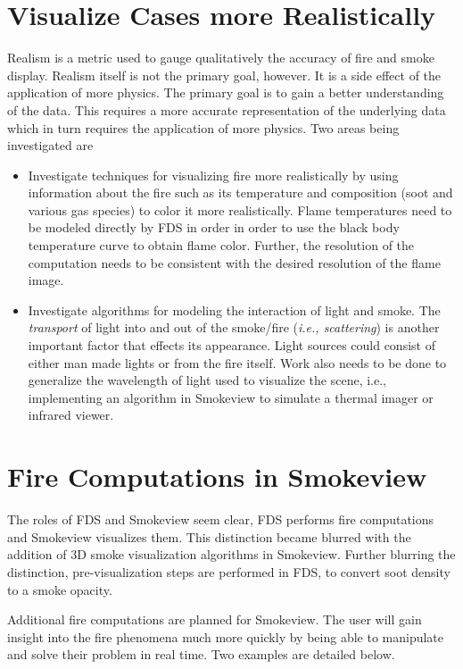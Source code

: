 \documentclass[11pt,twoside]{book}
\begin{document}
\section{Visualize Cases more Realistically}
Realism is a metric used to gauge qualitatively the accuracy of
fire and smoke display. Realism itself is not the primary goal,
however.  It is a side effect of the application of more physics.
The primary goal is to gain a better understanding of the data.
This requires a more accurate representation of the underlying
data which in turn requires the application of more physics.  Two
areas being investigated are
\begin{itemize}
\item Investigate techniques for visualizing fire more
realistically by using information about the fire such as its
temperature and composition (soot and various gas species) to
color it more realistically.  Flame temperatures need to be
modeled directly by FDS in order in order to use the black body
temperature curve to obtain flame color.  Further, the resolution
of the computation needs to be consistent with the desired
resolution of the flame image.

\item Investigate algorithms for modeling the interaction of light
and smoke. The {\em transport} of light into and out of the
smoke/fire ({\em i.e., scattering}) is another important factor
that effects its appearance.  Light sources could consist of
either man made lights or from the fire itself.  Work also needs
to be done to generalize the wavelength of light used to visualize
the scene, i.e., implementing an algorithm in Smokeview to
simulate a thermal imager or infrared viewer.
\end{itemize}

%
%

\section{Fire Computations in Smokeview}
The roles of FDS and Smokeview seem clear, FDS performs fire
computations and Smokeview visualizes them. This distinction
became blurred with the addition of 3D smoke visualization
algorithms in Smokeview. Further blurring the distinction,
pre-visualization steps are performed in FDS, to convert soot
density to a smoke opacity.

Additional fire computations are planned for Smokeview.  The user
will gain insight into the fire phenomena much more quickly by
being able to manipulate and solve their problem in real time. Two
examples are detailed below.
\end{document}
